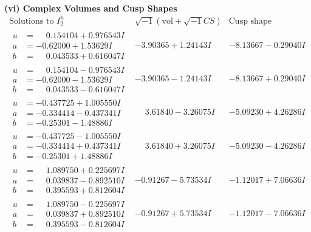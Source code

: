 \documentclass[1p]{elsarticle_modified}
\theoremstyle{definition}
\newcommand{\I}{\sqrt{-1}}
\begin{document}
\newpage\flushleft \textbf{(vi) Complex Volumes and Cusp Shapes}
$$\begin{array}{c|c|c}  
\text{Solutions to }I^u_{2}& \I (\text{vol} + \sqrt{-1}CS) & \text{Cusp shape}\\
 \hline 
\begin{aligned}
u &= \phantom{-}0.154104 + 0.976543 I \\
a &= -0.62000 + 1.53629 I \\
b &= \phantom{-}0.043533 + 0.616047 I\end{aligned}
 & -3.90365 + 1.24143 I & -8.13667 - 0.29040 I \\ \hline\begin{aligned}
u &= \phantom{-}0.154104 - 0.976543 I \\
a &= -0.62000 - 1.53629 I \\
b &= \phantom{-}0.043533 - 0.616047 I\end{aligned}
 & -3.90365 - 1.24143 I & -8.13667 + 0.29040 I \\ \hline\begin{aligned}
u &= -0.437725 + 1.005550 I \\
a &= -0.334414 - 0.437341 I \\
b &= -0.25301 - 1.48886 I\end{aligned}
 & \phantom{-}3.61840 - 3.26075 I & -5.09230 + 4.26286 I \\ \hline\begin{aligned}
u &= -0.437725 - 1.005550 I \\
a &= -0.334414 + 0.437341 I \\
b &= -0.25301 + 1.48886 I\end{aligned}
 & \phantom{-}3.61840 + 3.26075 I & -5.09230 - 4.26286 I \\ \hline\begin{aligned}
u &= \phantom{-}1.089750 + 0.225697 I \\
a &= \phantom{-}0.039837 - 0.892510 I \\
b &= \phantom{-}0.395593 + 0.812604 I\end{aligned}
 & -0.91267 - 5.73534 I & -1.12017 + 7.06636 I \\ \hline\begin{aligned}
u &= \phantom{-}1.089750 - 0.225697 I \\
a &= \phantom{-}0.039837 + 0.892510 I \\
b &= \phantom{-}0.395593 - 0.812604 I\end{aligned}
 & -0.91267 + 5.73534 I & -1.12017 - 7.06636 I \\ \hline\begin{aligned}

\end{aligned}
\end{array}$$
\end{document}
